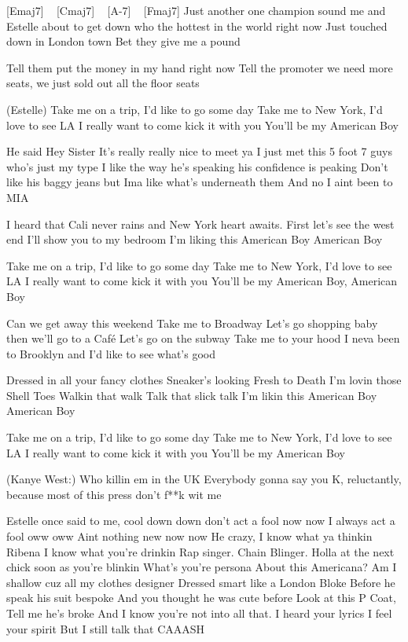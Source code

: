 
[Emaj7] ~ [Cmaj7] ~ [A-7] ~ [Fmaj7]
 Just another one champion sound
me and Estelle about to get down
who the hottest in the world right now
Just touched down in London town
Bet they give me a pound

Tell them put the money in my hand right now
Tell the promoter we need more seats,
we just sold out all the floor seats

(Estelle)
Take me on a trip, I'd like to go some day
Take me to New York, I'd love to see LA
I really want to come kick it with you
You'll be my American Boy

He said Hey Sister
It's really really nice to meet ya
I just met this 5 foot 7 guys who's just my type
I like the way he's speaking his confidence is peaking
Don't like his baggy jeans but Ima like what's underneath them
And no I aint been to MIA

I heard that Cali never rains and New York heart awaits. First let's see the west end
I'll show you to my bedroom
I'm liking this American Boy
American Boy

Take me on a trip, I'd like to go some day
Take me to New York, I'd love to see LA
I really want to come kick it with you
You'll be my American Boy, American Boy

Can we get away this weekend
Take me to Broadway
Let's go shopping baby then we'll go to a Café
Let's go on the subway
Take me to your hood
I neva been to Brooklyn and I'd like to see what's good

Dressed in all your fancy clothes
Sneaker's looking Fresh to Death I'm lovin those Shell Toes
Walkin that walk
Talk that slick talk
I'm likin this American Boy
American Boy

Take me on a trip, I'd like to go some day
Take me to New York, I'd love to see LA
I really want to come kick it with you
You'll be my American Boy

(Kanye West:)
Who killin em in the UK
Everybody gonna say you K,
reluctantly, because most of this press don't f**k wit me

Estelle once said to me, cool down down
don't act a fool now now
I always act a fool oww oww
Aint nothing new now now
He crazy, I know what ya thinkin
Ribena I know what you're drinkin
Rap singer. Chain Blinger. Holla at the next chick soon as you're blinkin
What's you're persona
About this Americana?
Am I shallow cuz all my clothes designer
Dressed smart like a London Bloke
Before he speak his suit bespoke
And you thought he was cute before
Look at this P Coat, Tell me he's broke
And I know you're not into all that. I heard your lyrics I feel your spirit
But I still talk that CAAASH

